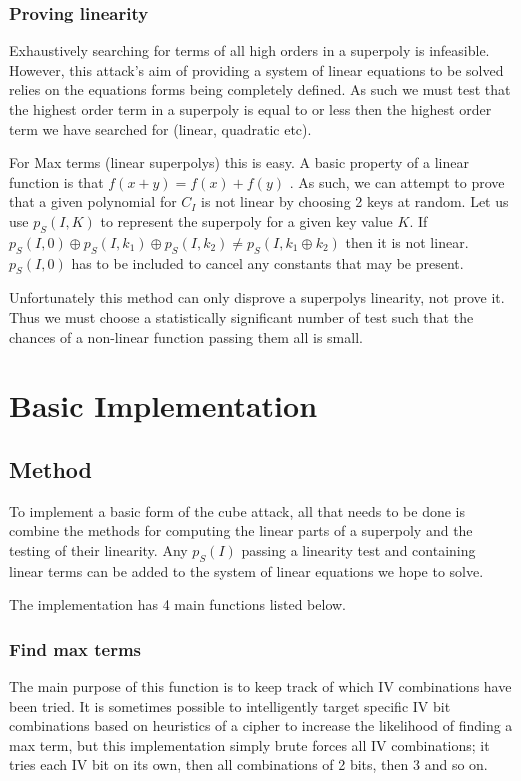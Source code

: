 \documentclass{report}
\let\Oldsection\section
\renewcommand{\section}{\FloatBarrier\Oldsection}
\let\Oldsubsection\subsection
\renewcommand{\subsection}{\FloatBarrier\Oldsubsection}
\let\Oldsubsubsection\subsubsection
\renewcommand{\subsubsection}{\FloatBarrier\Oldsubsubsection}
\begin{document}
\subsubsection{Proving linearity}
Exhaustively searching for terms of all high orders in a superpoly is infeasible. However, this attack's aim of providing a system of linear equations to be solved relies on the equations forms being completely defined. As such we must test that the highest order term in a superpoly is equal to or less then the highest order term we have searched for (linear, quadratic etc).

For Max terms (linear superpolys) this is easy. A basic property of a linear function is that $f(x+y)=f(x)+f(y)$ \cite{linearproperties}.
As such, we can attempt to prove that a given polynomial for $C_I$ is not linear by choosing 2 keys at random. Let us use $p_S(I,K)$ to represent the superpoly for a given key value $K$. If $p_S(I,0) \oplus p_S(I, k_1)\oplus p_S(I, k_2) \neq p_S(I, k_1 \oplus k_2)$ then it is not linear. $p_S(I, 0)$ has to be included to cancel any constants that may be present.

Unfortunately this method can only disprove a superpolys linearity, not prove it. Thus we must choose a statistically significant number of test such that the chances of a non-linear function passing them all is small.%

\section{Basic Implementation}
\subsection{Method}
To implement a basic form of the cube attack, all that needs to be done is combine the methods for computing the linear parts of a superpoly and the testing of their linearity. Any $p_S(I)$ passing a linearity test and containing linear terms can be added to the system of linear equations we hope to solve.

The implementation has 4 main functions listed below.

\subsubsection{Find max terms}
The main purpose of this function is to keep track of which IV combinations have been tried. It is sometimes possible to intelligently target specific IV bit combinations based on heuristics of a cipher to increase the likelihood of finding a max term, but this implementation simply brute forces all IV combinations; it tries each IV bit on its own, then all combinations of 2 bits, then 3 and so on.
\end{document}
